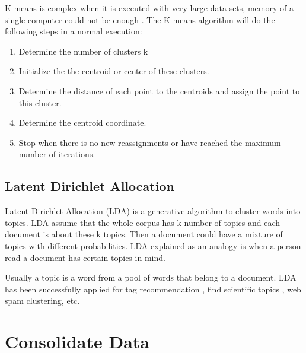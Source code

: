 \documentclass[11pt]{article}
\begin{document}
K-means is complex when it is executed with very large data sets, memory of a single computer could not be enough \cite{Shindler}. The K-means algorithm will do the following steps in a normal execution:
\begin{enumerate}
	\item Determine the number of clusters k
	\item Initialize the the centroid or center of these clusters.
	\item Determine the distance of each point to the centroids and assign the point to this cluster.
	\item Determine the centroid coordinate.
	\item Stop when there is no new reassignments or have reached the maximum number of iterations. 
\end{enumerate} 


\subsection{Latent Dirichlet Allocation}

Latent Dirichlet Allocation (LDA)%
is a generative algorithm to cluster words into topics. LDA assume that the whole corpus has k number of topics and each document is about these k topics. Then a document could have a mixture of topics with different probabilities. LDA explained as an analogy is when a person read a document has certain topics in mind. 

Usually a topic is a word from a pool of words that belong to a document. LDA has been successfully applied for tag recommendation \cite{Krestel}, find scientific topics \cite{Griffiths}, web spam clustering\cite{Biro}, etc.

\section{Consolidate Data}
\label{label:consolidatedate}
\end{document}
